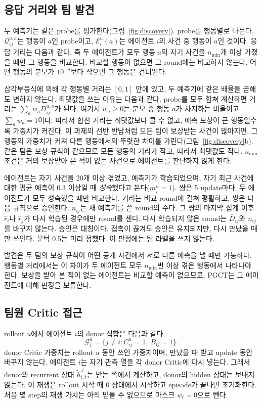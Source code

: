 \documentclass[10pt,twocolumn,letterpaper]{article}
\begin{document}
\subsection{응답 거리와 팀 발견}
두 예측기는 같은 probe를 평가한다(그림~\ref{fig:discovery}). probe를 행동별로 나눈다. $\mathcal Q_{ij}^{u,a}$는 행동이 $a$인 probe이고, $\mathcal E_i^u(a)$는 에이전트 $i$의 사건 중 행동이 $a$인 것이다. 응답 거리는 다음과 같다.
\ActionDistanceEquation
즉 두 에이전트가 모두 행동 $a$의 자기 사건을 $n_{\min}$개 이상 가졌을 때만 그 행동을 비교한다. 비교할 행동이 없으면 그 round에는 비교하지 않는다. 어떤 행동의 분모가 $10^{-8}$보다 작으면 그 행동은 건너뛴다.

삼각부등식에 의해 각 행동별 거리는 $[0,1]$ 안에 있고, 두 예측기에 같은 배율을 곱해도 변하지 않는다. 최댓값을 쓰는 이유는 다음과 같다. probe를 모두 합쳐 계산하면 거리는 $\sum_a w_aD_{ij}^{u,a}$가 된다. 여기서 $w_a\ge0$는 분모 중 행동 $a$가 차지하는 비율이고 $\sum_a w_a=1$이다. 따라서 합친 거리는 최댓값보다 클 수 없고, 예측 보상이 큰 행동일수록 가중치가 커진다. 이 과제의 선반 반납처럼 모든 팀이 보상받는 사건이 많아지면, 그 행동의 가중치가 커져 다른 행동에서의 뚜렷한 차이를 가린다(그림~\ref{fig:discovery}b). 같은 팀은 보상 규칙이 같으므로 모든 행동의 거리가 작고, 따라서 최댓값도 작다. $n_{\min}$ 조건은 거의 보상받아 본 적이 없는 사건으로 에이전트를 판단하지 않게 한다.

에이전트는 자기 사건을 20개 이상 겪었고, 예측기가 학습되었으며, 자기 최근 사건에 대한 평균 예측이 0.3 이상일 때 \emph{성숙}했다고 본다($m_i^u=1$). 쌍은 5 update마다, 두 에이전트가 모두 성숙했을 때만 비교한다. 거리는 비교 round에 걸쳐 평활하고, 쌍은 다음 규칙으로 승인한다.
\ApprovalEquation
$n_{ij}$는 새 예측기를 쓴 round의 수다. 그 쌍의 마지막 집계 이후 $\widehat r_i$나 $\widehat r_j$가 다시 학습된 경우에만 round를 센다. 다시 학습되지 않은 round는 $\bar D_{ij}$와 $n_{ij}$를 바꾸지 않는다. 승인은 대칭이다. 접촉이 끊겨도 승인은 유지되지만, 다시 만났을 때만 쓰인다. 문턱 0.5는 미리 정했다. 이 판정에는 팀 라벨을 쓰지 않는다.

발견은 두 팀의 보상 규칙이 어떤 공개 사건에서 서로 다른 예측을 낼 때만 가능하다. 행동별 거리에서는 이 차이가 두 에이전트 모두 $n_{\min}$번 이상 겪은 행동에서 나타나야 한다. 보상을 받아 본 적이 없는 에이전트는 비교할 예측이 없으므로, PGCT는 그 에이전트에 대해 판정을 보류한다.

\subsection{팀원 Critic 접근}
rollout $u$에서 에이전트 $i$의 donor 집합은 다음과 같다.
\begin{equation}\label{eq:donorset}
\mathcal G_i^u=\{j\ne i: C_{ij}^u=1,\ B_{ij}=1\}.
\end{equation}
donor Critic 가중치는 rollout $u$ 동안 쓰인 가중치이며, 만났을 때 받고 update 동안 바꾸지 않는다. 에이전트 $i$는 자기 관측 열을 각 donor Critic에 다시 넣는다. 그래서 donor의 recurrent 상태 $\tilde h^{\,j}_{i,t}$는 받는 쪽에서 계산하고, donor의 hidden 상태는 보내지 않는다. 이 재생은 rollout 시작 때 0 상태에서 시작하고 episode가 끝나면 초기화한다. 처음 몇 step의 재생 가치는 아직 믿을 수 없으므로 마스크 $w_t=0$으로 뺀다.
\end{document}
